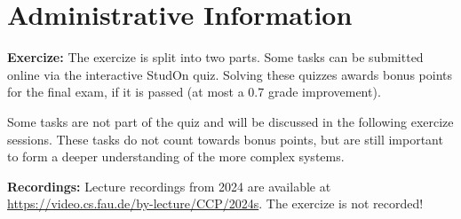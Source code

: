 \section{Administrative Information}
\label{sec:admin}

\textbf{Exercize:} The exercize is split into two parts. Some tasks can be submitted online via the interactive StudOn quiz. Solving these quizzes awards bonus points for the final exam, if it is passed (at most a 0.7 grade improvement).

Some tasks are not part of the quiz and will be discussed in the following exercize sessions. These tasks do not count towards bonus points, but are still important to form a deeper understanding of the more complex systems.

\textbf{Recordings:} Lecture recordings from 2024 are available at \url{https://video.cs.fau.de/by-lecture/CCP/2024s}. The exercize is not recorded!